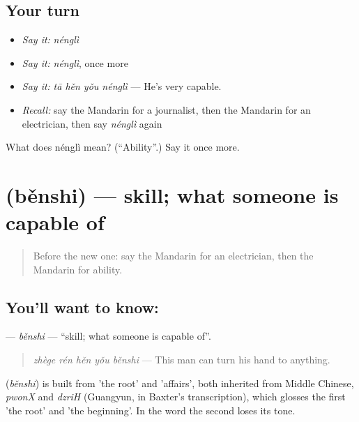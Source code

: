 \subsection*{Your turn}
\begin{itemize}
\raggedright
  \item \emph{Say it:} \emph{nénglì}
  \item \emph{Say it:} \emph{nénglì}, once more
  \item \emph{Say it:} \emph{tā hěn yǒu nénglì} — He's very capable.
  \item \emph{Recall:} say the Mandarin for a journalist, then the Mandarin for an electrician, then say \emph{nénglì} again
\end{itemize}

\begin{tcolorbox}[breakable,colback=teal!4,colframe=teal!35!black,title={Before you move on}]
What does nénglì mean? (\textquotedblleft{}Ability\textquotedblright{}.) Say it once more.
\end{tcolorbox}
\section[\texorpdfstring{\zh{本事} (běnshi)}{本事 (běnshi)}]{ (běnshi) — skill; what someone is capable of}

\label{lesson:ZH-C260-benshi}



\begin{quote}
Before the new one: say the Mandarin for an electrician, then the Mandarin for ability.
\end{quote}

\subsection*{You'll want to know: }
\textbf{} — \emph{běnshi} — \textquotedblleft{}skill; what someone is capable of\textquotedblright{}.

\begin{quote}
\textbf{} \emph{zhège rén hěn yǒu běnshi} — This man can turn his hand to anything.
\end{quote}

\begin{cousinweb}
\textbf{} (\emph{běnshi}) is built from  'the root' and  'affairs', both inherited from Middle Chinese, \emph{pwonX} and \emph{dzriH} (Guangyun, in Baxter's transcription), which glosses the first 'the root' and 'the beginning'. In the word the second loses its tone.
\end{cousinweb}

